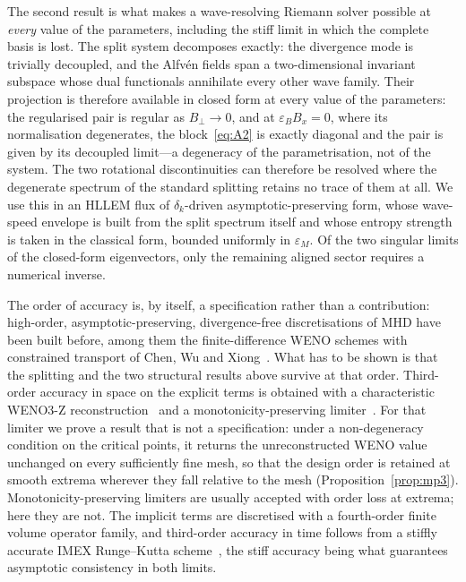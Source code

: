\documentclass[a4paper,fleqn]{cas-sc}
\theoremstyle{remark}
\newcommand{\eps}{\varepsilon}
\newcommand{\epsM}{\eps_{M}}
\newcommand{\epsB}{\eps_{B}}
\begin{document}
The second result is what makes a wave-resolving Riemann solver possible at
\emph{every} value of the parameters, including the stiff limit in which the
complete basis is lost. The split system decomposes exactly: the divergence mode
is trivially decoupled, and the Alfv\'en fields span a two-dimensional invariant
subspace whose dual functionals annihilate every other wave family. Their
projection is therefore available in closed form at every value of the
parameters: the regularised pair is regular as $B_\perp\to0$, and at
$\epsB B_x=0$, where its normalisation degenerates, the block~\eqref{eq:A2} is
exactly diagonal and the pair is given by its decoupled limit---a degeneracy of
the parametrisation, not of the system. The two rotational discontinuities can
therefore be resolved where the degenerate spectrum of the standard splitting
retains no trace of them at all. We use this in an HLLEM flux of $\delta_k$-driven
asymptotic-preserving form, whose wave-speed envelope is built from the split
spectrum itself and whose entropy strength is taken in the classical form,
bounded uniformly in $\epsM$. Of the two singular limits of the closed-form
eigenvectors, only the remaining aligned sector requires a numerical inverse.

The order of accuracy is, by itself, a specification rather than a
contribution: high-order, asymptotic-preserving, divergence-free
discretisations of MHD have been built before, among them the finite-difference
WENO schemes with constrained transport of Chen, Wu and
Xiong~\cite{ChenWuXiong2023}. What has to be shown is that the splitting and
the two structural results above survive at that order. Third-order accuracy in
space on the explicit terms is obtained with a characteristic WENO3-Z
reconstruction~\cite{DonBorges2013, BORGES20083191} and a
monotonicity-preserving limiter~\cite{SureshHuynh1997}. For that limiter we
prove a result that is not a specification: under a non-degeneracy condition on
the critical points, it returns the unreconstructed WENO value unchanged on
every sufficiently fine mesh, so that the design order is retained at smooth
extrema wherever they fall relative to the mesh
(Proposition~\ref{prop:mp3}). Monotonicity-preserving limiters are usually
accepted with order loss at extrema; here they are not. The implicit terms are discretised
with a fourth-order finite volume operator family, and third-order accuracy in
time follows from a stiffly accurate IMEX Runge--Kutta
scheme~\cite{BoscheriPareschi2021}, the stiff accuracy being what guarantees
asymptotic consistency in both limits.
\end{document}
